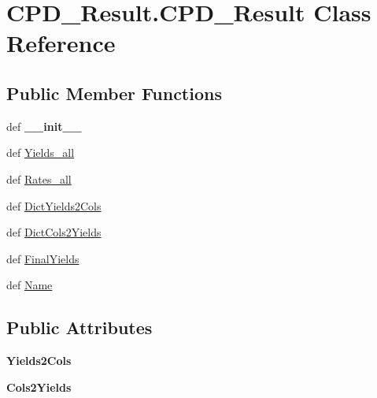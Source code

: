 \hypertarget{classCPD__Result_1_1CPD__Result}{\section{\-C\-P\-D\-\_\-\-Result.\-C\-P\-D\-\_\-\-Result \-Class \-Reference}
\label{classCPD__Result_1_1CPD__Result}
}
\subsection*{\-Public \-Member \-Functions}
\begin{DoxyCompactItemize}
\item 
\hypertarget{classCPD__Result_1_1CPD__Result_a6facfa712b7209093d5853e4e97a0910}{def {\bfseries \-\_\-\-\_\-init\-\_\-\-\_\-}}\label{classCPD__Result_1_1CPD__Result_a6facfa712b7209093d5853e4e97a0910}

\item 
def \hyperlink{classCPD__Result_1_1CPD__Result_a8171b3aa9efd91fc226bb910f1e653fc}{\-Yields\-\_\-all}
\item 
def \hyperlink{classCPD__Result_1_1CPD__Result_ac71d13472677054d8be96bc9f4f91449}{\-Rates\-\_\-all}
\item 
def \hyperlink{classCPD__Result_1_1CPD__Result_a210a0f1beeb5c88362aabb450f55d87c}{\-Dict\-Yields2\-Cols}
\item 
def \hyperlink{classCPD__Result_1_1CPD__Result_a53308302fc01266999982256fe5f0b22}{\-Dict\-Cols2\-Yields}
\item 
def \hyperlink{classCPD__Result_1_1CPD__Result_ae90905a45df31feba8dcc421ae500a1c}{\-Final\-Yields}
\item 
def \hyperlink{classCPD__Result_1_1CPD__Result_a5ba3868691abfb6054ac34083fe870f9}{\-Name}
\end{DoxyCompactItemize}
\subsection*{\-Public \-Attributes}
\begin{DoxyCompactItemize}
\item 
\hypertarget{classCPD__Result_1_1CPD__Result_a82b0cca7bc6914ce5d6336da54eff319}{{\bfseries \-Yields2\-Cols}}\label{classCPD__Result_1_1CPD__Result_a82b0cca7bc6914ce5d6336da54eff319}

\item 
\hypertarget{classCPD__Result_1_1CPD__Result_acb42c659d4d148b9224ec474bd008dde}{{\bfseries \-Cols2\-Yields}}\label{classCPD__Result_1_1CPD__Result_acb42c659d4d148b9224ec474bd008dde}

\end{DoxyCompactItemize}


